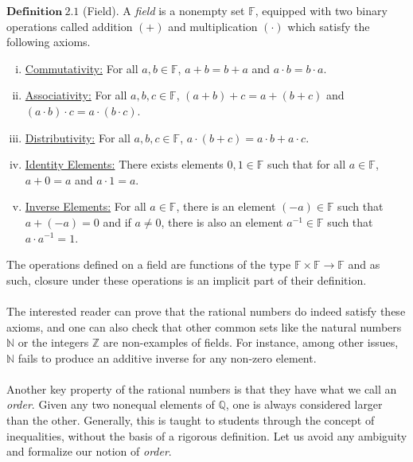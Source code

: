 \documentclass[12pt]{article}
\theoremstyle{definition}
\theoremstyle{remark}
\begin{document}
\noindent $\mathbf{Definition\ 2.1}$ (Field)\cite[pg.11]{paper}.
        A \textit{field} is a nonempty set $\mathbb{F}$, equipped with two binary operations called addition $(+)$ and multiplication $(\cdot)$ which satisfy the following axioms.\\
        
        \begin{enumerate}[(i)]
            \item \underline{Commutativity:} For all $a,b\in\mathbb{F}$, $a+b=b+a$ and $a\cdot b=b\cdot a$.
            \item \underline{Associativity:} For all $a,b,c\in\mathbb{F}$, $(a+b)+c=a+(b+c)$ and $(a\cdot b)\cdot c=a\cdot (b\cdot c)$.
            \item \underline{Distributivity:} For all $a,b,c\in\mathbb{F}$, $a\cdot (b+c)=a\cdot b + a\cdot c$.
            \item \underline{Identity Elements:} There exists elements $0,1\in\mathbb{F}$ such that for all $a\in\mathbb{F}$, $a+0=a$ and $a\cdot 1=a$.
            \item \underline{Inverse Elements:} For all $a\in\mathbb{F}$, there is an element $(-a)\in\mathbb{F}$ such that $a+(-a)=0$ and if $a\neq 0$, there is also an element $a^{-1}\in\mathbb{F}$ such that $a\cdot a^{-1}=1$.\\
        \end{enumerate}
        
\noindent The operations defined on a field are functions of the type $\mathbb{F}\times\mathbb{F}\rightarrow \mathbb{F}$ and as such, closure under these operations is an implicit part of their definition.\\\\
\noindent The interested reader can prove that the rational numbers do indeed satisfy these axioms, and one can also check that other common sets like the natural numbers $\mathbb{N}$ or the integers $\mathbb{Z}$ are non-examples of fields. For instance, among other issues, $\mathbb{N}$ fails to produce an additive inverse for any non-zero element.\\\\    
\noindent Another key property of the rational numbers is that they have what we call an \textit{order}. Given any two nonequal elements of $\mathbb{Q}$, one is always considered larger than the other. Generally, this is taught to students through the concept of inequalities, without the basis of a rigorous definition. Let us avoid any ambiguity and formalize our notion of \textit{order}.\\\
        
\end{document}
